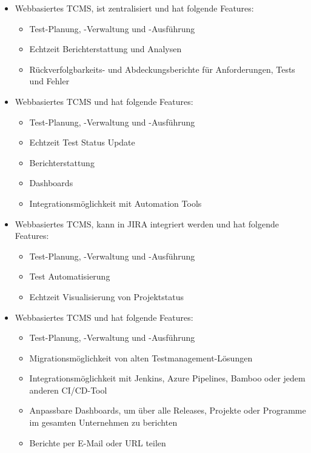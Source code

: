 \documentclass[a4paper, fontsize=11pt, parskip=half, twoside, headings=openright]{scrreprt}
\begin{document}
	\begin{itemize}
		\item \textcite{noauthor_testrail_2023} 
		
		Webbasiertes \ac{TCMS}, ist zentralisiert und hat folgende Features:
		
		\begin{itemize}
			\setlength\itemsep{-0.5em}
			\item Test-Planung, -Verwaltung und -Ausführung 
			\item Echtzeit Berichterstattung und Analysen
			\item Rückverfolgbarkeits- und Abdeckungsberichte für Anforderungen, Tests und Fehler
		\end{itemize}
		
		\item \textcite{noauthor_practitest_nodate} 
		
		Webbasiertes \ac{TCMS} und hat folgende Features:
		
		\begin{itemize}
			\setlength\itemsep{-0.5em}
			\item Test-Planung, -Verwaltung und -Ausführung 
			\item Echtzeit Test Status Update
			\item Berichterstattung
			\item Dashboards
			\item Integrationsmöglichkeit mit Automation Tools
		\end{itemize}
		
		\item \textcite{noauthor_zephyr_nodate} 
		
		Webbasiertes \ac{TCMS}, kann in JIRA integriert werden und hat folgende Features:
		
		\begin{itemize}
			\setlength\itemsep{-0.5em}
			\item Test-Planung, -Verwaltung und -Ausführung 
			\item Test Automatisierung
			\item Echtzeit Visualisierung von Projektstatus
		\end{itemize}
		
		\item \textcite{noauthor_tricentis_nodate} 
		
		Webbasiertes \ac{TCMS} und hat folgende Features:
		
		\begin{itemize}
			\setlength\itemsep{-0.5em}
			\item Test-Planung, -Verwaltung und -Ausführung 
			\item Migrationsmöglichkeit von alten Testmanagement-Lösungen
			\item Integrationsmöglichkeit mit Jenkins, Azure Pipelines, Bamboo oder jedem anderen CI/CD-Tool
			\item Anpassbare Dashboards, um über alle Releases, Projekte oder Programme im gesamten Unternehmen zu berichten
			\item Berichte per E-Mail oder URL teilen
		\end{itemize}
	\end{itemize}
	
\end{document}
